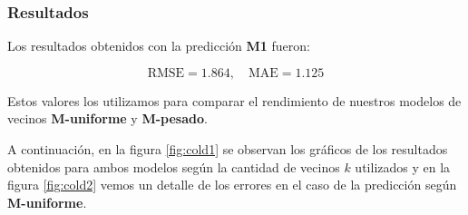 \documentclass[hidelinks,12pt,a4paper]{book}
\theoremstyle{plain}
\theoremstyle{definition}
\begin{document}
\subsubsection{Resultados}

Los resultados obtenidos con la predicción \textbf{M1} fueron:

\begin{equation*}
\text{RMSE} = 1.864,\quad \text{MAE}= 1.125
\end{equation*}

Estos valores los utilizamos para comparar el rendimiento de nuestros modelos de vecinos \textbf{M-uniforme} y \textbf{M-pesado}. 

A continuación, en la figura \ref{fig:cold1} se observan los gráficos de los resultados obtenidos para ambos modelos según la cantidad de vecinos $k$ utilizados y en la figura \ref{fig:cold2} vemos un detalle de los errores en el caso de la predicción según \textbf{M-uniforme}.
\end{document}
